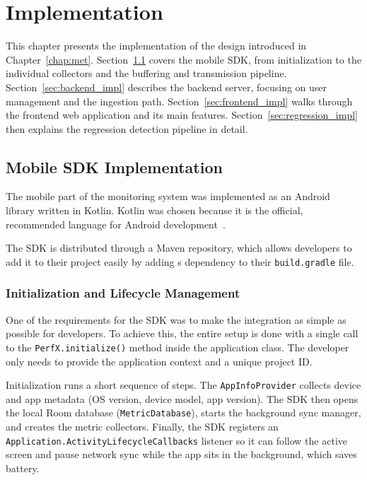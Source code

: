 \chapter{Implementation}
\label{chap:impl}

This chapter presents the implementation of the design introduced in Chapter~\ref{chap:met}. Section~\ref{sec:sdk_impl} covers the mobile SDK, from initialization to the individual collectors and the buffering and transmission pipeline. Section~\ref{sec:backend_impl} describes the backend server, focusing on user management and the ingestion path. Section~\ref{sec:frontend_impl} walks through the frontend web application and its main features. Section~\ref{sec:regression_impl} then explains the regression detection pipeline in detail.

\section{Mobile SDK Implementation}
\label{sec:sdk_impl}

The mobile part of the monitoring system was implemented as an Android library written in Kotlin. Kotlin was chosen because it is the official, recommended language for Android development~\cite{KotlinFirst}.


The SDK is distributed through a Maven repository, which allows developers to add it to their project easily by adding s dependency to their \texttt{build.gradle} file.

\subsection{Initialization and Lifecycle Management}

One of the requirements for the SDK was to make the integration as simple as possible for developers. To achieve this, the entire setup is done with a single call to the \texttt{PerfX.initialize()} method inside the application class. The developer only needs to provide the application context and a unique project ID.

Initialization runs a short sequence of steps. The \texttt{AppInfoProvider} collects device and app metadata (OS version, device model, app version). The SDK then opens the local Room database (\texttt{MetricDatabase}), starts the background sync manager, and creates the metric collectors. Finally, the SDK registers an \texttt{Application.ActivityLifecycleCallbacks} listener so it can follow the active screen and pause network sync while the app sits in the background, which saves battery.

